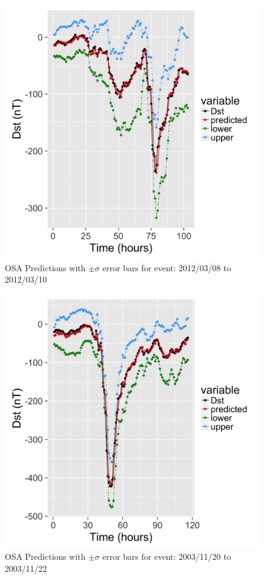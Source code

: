 \documentclass{article}
\begin{document}
\begin{figure}[h]
  \includegraphics[width=\textwidth]{PredictionsModel1/PredErrBars_Storm16.png}
  \caption{OSA Predictions with $\pm \sigma$ error bars for event: 2012/03/08 to 2012/03/10}
  \label{fig:ComparePred2}
\end{figure}

\begin{figure}[h]
  \includegraphics[width=\textwidth]{PredictionsModel1/PredErrBars_Storm46.png}
  \caption{OSA Predictions with $\pm \sigma$ error bars for event: 2003/11/20 to 2003/11/22}
  \label{fig:ComparePred3}
\end{figure}
\end{document}
